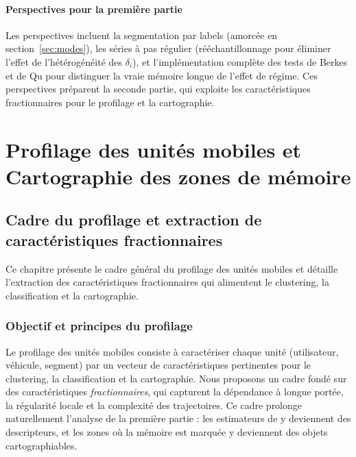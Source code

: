 \subsection{Perspectives pour la première partie}
Les perspectives incluent la segmentation par labels (amorcée en section~\ref{sec:modes}), les séries à pas régulier (rééchantillonnage pour éliminer l'effet de l'hétérogénéité des $\delta_i$), et l'implémentation complète des tests de Berkes et de Qu \cite{qu2011} pour distinguer la vraie mémoire longue de l'effet de régime. Ces perspectives préparent la seconde partie, qui exploite les caractéristiques fractionnaires pour le profilage et la cartographie.

\part{Profilage des unités mobiles et Cartographie des zones de mémoire}

\chapter{Cadre du profilage et extraction de caractéristiques fractionnaires}
\label{chap:caracteristiques}

Ce chapitre présente le cadre général du profilage des unités mobiles et détaille l'extraction des caractéristiques fractionnaires qui alimentent le clustering, la classification et la cartographie.

\section{Objectif et principes du profilage}
\label{sec:objectif_profilage}
Le profilage des unités mobiles consiste à caractériser chaque unité (utilisateur, véhicule, segment) par un vecteur de caractéristiques pertinentes pour le clustering, la classification et la cartographie. Nous proposons un cadre fondé sur des caractéristiques \emph{fractionnaires}, qui capturent la dépendance à longue portée, la régularité locale et la complexité des trajectoires. Ce cadre prolonge naturellement l'analyse de la première partie : les estimateurs de \Hurst{} y deviennent des descripteurs, et les zones où la mémoire est marquée y deviennent des objets cartographiables.

